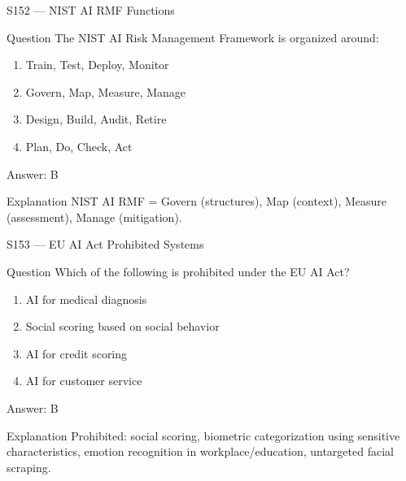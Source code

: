 \documentclass[aspectratio=169,8pt]{beamer}
\begin{document}
	\begin{frame}{S152 --- NIST AI RMF Functions}
		\begin{block}{Question}
			The NIST AI Risk Management Framework is organized around:
			\begin{enumerate}
				\item Train, Test, Deploy, Monitor
				\item Govern, Map, Measure, Manage
				\item Design, Build, Audit, Retire
				\item Plan, Do, Check, Act
			\end{enumerate}
		\end{block}
		\begin{exampleblock}{Answer: B}\end{exampleblock}
		\begin{block}{Explanation}
			NIST AI RMF = Govern (structures), Map (context), Measure (assessment), Manage (mitigation).
		\end{block}
	\end{frame}
	
	\begin{frame}{S153 --- EU AI Act Prohibited Systems}
		\begin{block}{Question}
			Which of the following is prohibited under the EU AI Act?
			\begin{enumerate}
				\item AI for medical diagnosis
				\item Social scoring based on social behavior
				\item AI for credit scoring
				\item AI for customer service
			\end{enumerate}
		\end{block}
		\begin{exampleblock}{Answer: B}\end{exampleblock}
		\begin{block}{Explanation}
			Prohibited: social scoring, biometric categorization using sensitive characteristics, emotion recognition in workplace/education, untargeted facial scraping.
		\end{block}
	\end{frame}
	
\end{document}
